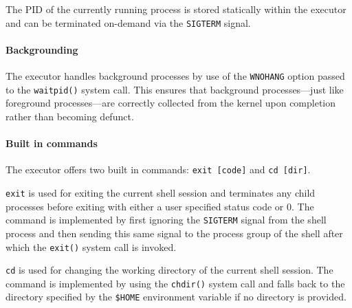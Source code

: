 The PID of the currently running process is stored statically within the executor and can be terminated on-demand via the \texttt{SIGTERM} signal.

\paragraph{Backgrounding} The executor handles background processes by use of the \texttt{WNOHANG} option passed to the \texttt{waitpid()} system call. This ensures that background processes---just like foreground processes---are correctly collected from the kernel upon completion rather than becoming defunct.

\paragraph{Built in commands} The executor offers two built in commands: \texttt{exit [code]} and \texttt{cd [dir]}.

\texttt{exit} is used for exiting the current shell session and terminates any child processes before exiting with either a user specified status code or 0. The command is implemented by first ignoring the \texttt{SIGTERM} signal from the shell process and then sending this same signal to the process group of the shell after which the \texttt{exit()} system call is invoked.

\texttt{cd} is used for changing the working directory of the current shell session. The command is implemented by using the \texttt{chdir()} system call and falls back to the directory specified by the \texttt{\$HOME} environment variable if no directory is provided.
